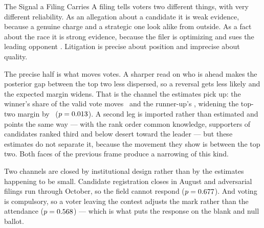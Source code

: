 
\begin{frame}[t]{The Signal a Filing Carries}
\hypertarget{src:signal}{}
\small
A filing tells voters two different things, with very different reliability. As
an allegation about a candidate it is weak evidence, because a genuine charge
and a strategic one look alike from outside. As a fact about the race it is
strong evidence, because the filer is optimizing and sues the leading opponent
. Litigation is precise about position and imprecise
about quality.
\vspace{4pt}

The precise half is what moves votes. A sharper read on who is ahead makes the
posterior gap between the top two less dispersed, so a reversal gets less
likely and the expected margin widens. That is the channel the estimates pick
up: the winner's share of the valid vote moves \WinShareCoef\ and the
runner-up's \RunnerUpCoef, widening the top-two margin by \MarginCoef\
($p=0.013$). A second leg is imported rather than estimated and points the
same way --- with the rank order common knowledge, supporters of candidates
ranked third and below desert toward the leader
 --- but these estimates do not separate it,
because the movement they show is between the top two. Both faces of the
previous frame produce a narrowing of this kind.
\vspace{4pt}

Two channels are closed by institutional design rather than by the estimates
happening to be small. Candidate registration closes in August and adversarial
filings run through October, so the field cannot respond ($p=0.677$). And
voting is compulsory, so a voter leaving the contest adjusts the mark rather
than the attendance ($p=0.568$) --- which is what puts the response on the
blank and null ballot.
\vfill
\centerline{\hyperlink{app:theory}{}\quad\hyperlink{app:transferfoil}{}}
\end{frame}
